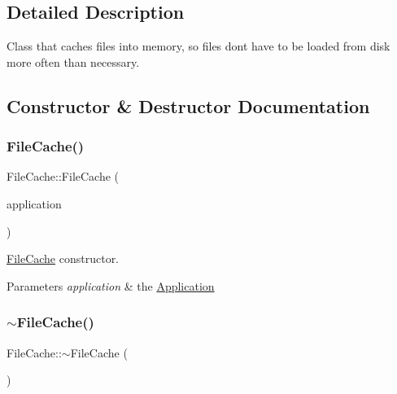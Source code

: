 \subsection{Detailed Description}
Class that caches files into memory, so files don\textquotesingle{}t have to be loaded from disk more often than necessary. 

\subsection{Constructor \& Destructor Documentation}
\mbox{\label{classsage_1_1FileCache_af88bef81fc34d1a1576d57c4e0261358}} 
\subsubsection{\texorpdfstring{FileCache()}{FileCache()}}
{\footnotesize\ttfamily File\+Cache\+::\+File\+Cache (\begin{DoxyParamCaption}\item[{\mbox{\hyperlink{classsage_1_1Application}{Application}} \&}]{application }\end{DoxyParamCaption})}



\mbox{\hyperlink{classsage_1_1FileCache}{File\+Cache}} constructor. 


\begin{DoxyParams}{Parameters}
{\em application} & the \mbox{\hyperlink{classsage_1_1Application}{Application}} \\
\hline
\end{DoxyParams}
\mbox{\label{classsage_1_1FileCache_a07c4e05a6d3d792685b48fba44142e08}} 
\subsubsection{\texorpdfstring{$\sim$FileCache()}{~FileCache()}}
{\footnotesize\ttfamily File\+Cache\+::$\sim$\+File\+Cache (\begin{DoxyParamCaption}{ }\end{DoxyParamCaption})}



